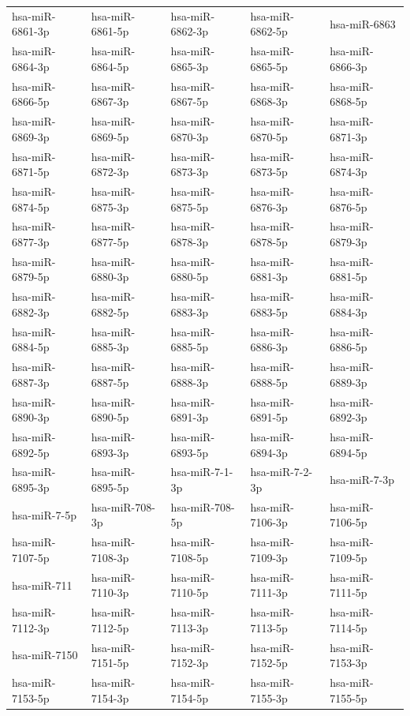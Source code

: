\begin{longtable}{lllll}
hsa-miR-6861-3p & hsa-miR-6861-5p & hsa-miR-6862-3p & hsa-miR-6862-5p & hsa-miR-6863 \\
hsa-miR-6864-3p & hsa-miR-6864-5p & hsa-miR-6865-3p & hsa-miR-6865-5p & hsa-miR-6866-3p \\
hsa-miR-6866-5p & hsa-miR-6867-3p & hsa-miR-6867-5p & hsa-miR-6868-3p & hsa-miR-6868-5p \\
hsa-miR-6869-3p & hsa-miR-6869-5p & hsa-miR-6870-3p & hsa-miR-6870-5p & hsa-miR-6871-3p \\
hsa-miR-6871-5p & hsa-miR-6872-3p & hsa-miR-6873-3p & hsa-miR-6873-5p & hsa-miR-6874-3p \\
hsa-miR-6874-5p & hsa-miR-6875-3p & hsa-miR-6875-5p & hsa-miR-6876-3p & hsa-miR-6876-5p \\
hsa-miR-6877-3p & hsa-miR-6877-5p & hsa-miR-6878-3p & hsa-miR-6878-5p & hsa-miR-6879-3p \\
hsa-miR-6879-5p & hsa-miR-6880-3p & hsa-miR-6880-5p & hsa-miR-6881-3p & hsa-miR-6881-5p \\
hsa-miR-6882-3p & hsa-miR-6882-5p & hsa-miR-6883-3p & hsa-miR-6883-5p & hsa-miR-6884-3p \\
hsa-miR-6884-5p & hsa-miR-6885-3p & hsa-miR-6885-5p & hsa-miR-6886-3p & hsa-miR-6886-5p \\
hsa-miR-6887-3p & hsa-miR-6887-5p & hsa-miR-6888-3p & hsa-miR-6888-5p & hsa-miR-6889-3p \\
hsa-miR-6890-3p & hsa-miR-6890-5p & hsa-miR-6891-3p & hsa-miR-6891-5p & hsa-miR-6892-3p \\
hsa-miR-6892-5p & hsa-miR-6893-3p & hsa-miR-6893-5p & hsa-miR-6894-3p & hsa-miR-6894-5p \\
hsa-miR-6895-3p & hsa-miR-6895-5p & hsa-miR-7-1-3p & hsa-miR-7-2-3p & hsa-miR-7-3p \\
hsa-miR-7-5p & hsa-miR-708-3p & hsa-miR-708-5p & hsa-miR-7106-3p & hsa-miR-7106-5p \\
hsa-miR-7107-5p & hsa-miR-7108-3p & hsa-miR-7108-5p & hsa-miR-7109-3p & hsa-miR-7109-5p \\
hsa-miR-711 & hsa-miR-7110-3p & hsa-miR-7110-5p & hsa-miR-7111-3p & hsa-miR-7111-5p \\
hsa-miR-7112-3p & hsa-miR-7112-5p & hsa-miR-7113-3p & hsa-miR-7113-5p & hsa-miR-7114-5p \\
hsa-miR-7150 & hsa-miR-7151-5p & hsa-miR-7152-3p & hsa-miR-7152-5p & hsa-miR-7153-3p \\
hsa-miR-7153-5p & hsa-miR-7154-3p & hsa-miR-7154-5p & hsa-miR-7155-3p & hsa-miR-7155-5p \\

\end{longtable}
